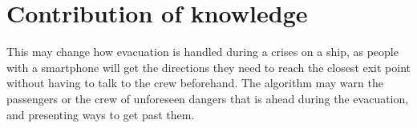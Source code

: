 \chapter{Contribution of knowledge}
\label{ch:contribution}


This may change how evacuation is handled during a crises on a ship, as people with a smartphone will get the directions they need to reach the closest exit point without having to talk to the crew beforehand. The algorithm may warn the passengers or the crew of unforeseen dangers that is ahead during the evacuation, and presenting ways to get past them.